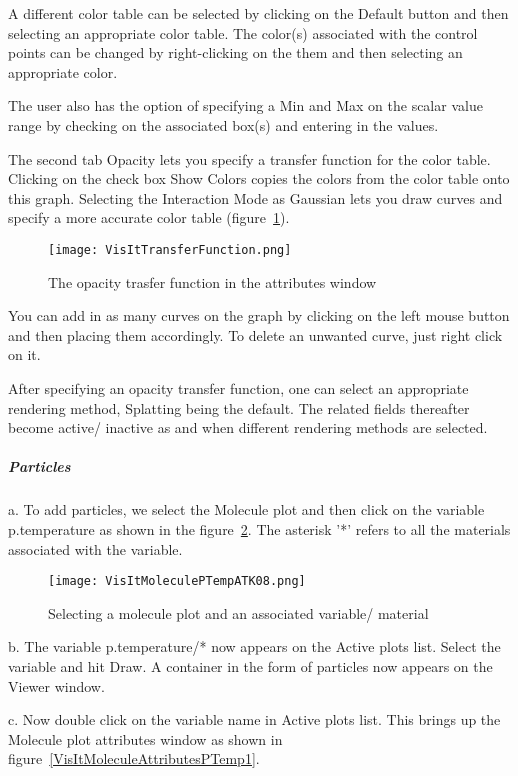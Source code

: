 A different color table can be selected by clicking on the Default button and then selecting an appropriate color table. The color(s) associated with the control points can be changed by right-clicking on the them and then selecting an appropriate color.

The user also has the option of specifying a Min and Max on the scalar value range by checking on the associated box(s) and entering in the values.

The second tab Opacity lets you specify a transfer function for the color table. Clicking on the check box Show Colors copies the colors from the color table onto this graph. Selecting the Interaction Mode as Gaussian lets you draw curves and specify a more accurate color table (figure~\ref{VisItTransferFunction}).

\begin{figure}
  \center
  \texttt{[image: VisItTransferFunction.png]}
  \caption{The opacity trasfer function in the attributes window}
  \label{VisItTransferFunction}
\end{figure}

You can add in as many curves on the graph by clicking on the left mouse button and then placing them accordingly. To delete an unwanted curve, just right click on it.

After specifying an opacity transfer function, one can select an appropriate rendering method, Splatting being the default. The related fields thereafter become active/ inactive as and when different rendering methods are selected.

\subparagraph{Particles}

a. To add particles, we select the Molecule plot and then click on the variable p.temperature as shown in the figure~\ref{VisItMoleculePTempATK08}. The asterisk '*' refers to all the materials associated with the variable.

\begin{figure}
  \center
  \texttt{[image: VisItMoleculePTempATK08.png]}
  \caption{Selecting a molecule plot and an associated variable/ material}
  \label{VisItMoleculePTempATK08}
\end{figure}

b. The variable p.temperature/* now appears on the Active plots list. Select the variable and hit Draw. A container in the form of particles now appears on the Viewer window.

c. Now double click on the variable name in Active plots list. This brings up the Molecule plot attributes window as shown in figure~\ref{VisItMoleculeAttributesPTemp1}.

